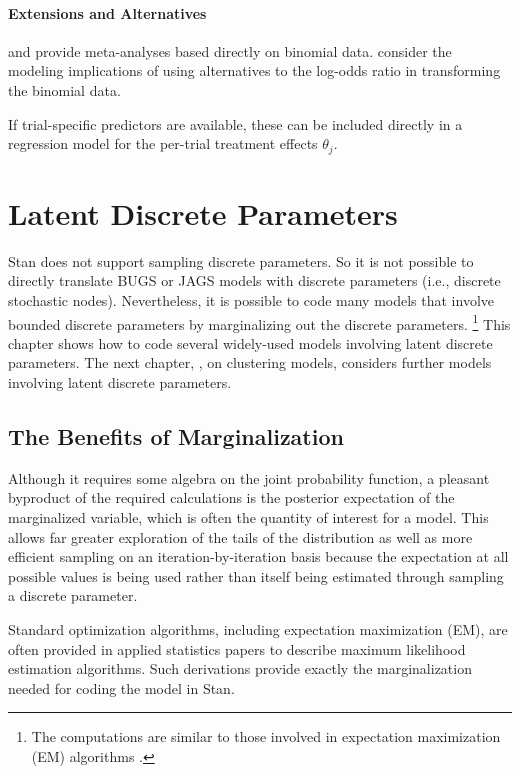 \subsubsection{Extensions and Alternatives}

\citet{SmithSpiegelhalterThomas:1995} and
\citet[Section~19.4]{GelmanEtAl:2013} provide
meta-analyses based directly on binomial data.
\citet{WarnThompsonSpiegelhalter:2002} consider the modeling
implications of using alternatives to the log-odds ratio in
transforming the binomial data.

If trial-specific predictors are available, these can be included
directly in a regression model for the per-trial treatment effects
$\theta_j$.


\chapter{Latent Discrete Parameters}\label{latent-discrete.chapter}

\noindent
Stan does not support sampling discrete parameters.  So it is not
possible to directly translate BUGS or JAGS models with discrete
parameters (i.e., discrete stochastic nodes).  Nevertheless, it is
possible to code many models that involve bounded discrete
parameters by marginalizing out the discrete parameters.%
%
\footnote{The computations are similar to those involved in
  expectation maximization (EM) algorithms
  \citep{dempster-et-al:1977}.}
%
This chapter shows how to code several widely-used models involving
latent discrete parameters.  The next chapter,
, on clustering models, considers further
models involving latent discrete parameters.

\section{The Benefits of Marginalization}\label{rao-blackwell.section}

Although it requires some algebra on the joint probability function,
a pleasant byproduct of the required calculations is the posterior
expectation of the marginalized variable, which is often the quantity
of interest for a model.  This allows far greater exploration of the
tails of the distribution as well as more efficient sampling on an
iteration-by-iteration basis because the expectation at all possible
values is being used rather than itself being estimated through
sampling a discrete parameter.

Standard optimization algorithms, including expectation maximization
(EM), are often provided in applied statistics papers to describe
maximum likelihood estimation algorithms.  Such derivations provide
exactly the marginalization needed for coding the model in Stan.

